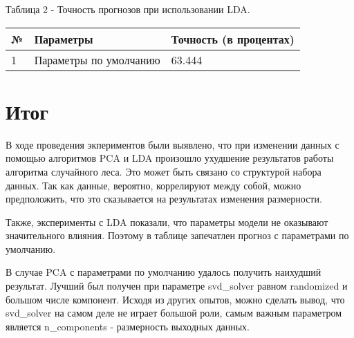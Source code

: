 \documentclass[a4paper,12pt]{article}
\begin{document}
\vspace{0.5cm}
	Таблица 2 - Точность прогнозов  при использовании LDA.
\begin{longtable}{|p{1cm}|p{9cm}|p{3cm}|}
\hline
№ & Параметры & Точность (в процентах) \\ 
\hline 
1 & Параметры по умолчанию & 63.444 \\
\hline
\end{longtable}


\newpage\section{Итог}
	В ходе проведения экпериментов были выявлено, что при изменении данных с помощью алгоритмов PCA и LDA произошло ухудшение результатов работы алгоритма случайного леса. Это может быть связано со структурой набора данных. Так как данные, вероятно, коррелируют между собой, можно предположить, что это сказывается на результатах изменения размерности.
	
	\vspace{0.5cm}
	Также, эксперименты с LDA показали, что параметры модели не оказывают значительного влияния. Поэтому в таблице запечатлен прогноз с параметрами по умолчанию. 
	
	\vspace{0.5cm}
	В случае PCA с параметрами по умолчанию удалось получить наихудший результат. Лучший был получен при параметре svd\_solver равном randomized и большом числе компонент. Исходя из других опытов, можно сделать вывод, что svd\_solver на самом деле не играет большой роли, самым важным параметром является n\_components - размерность выходных данных.
	
	
\end{document}
